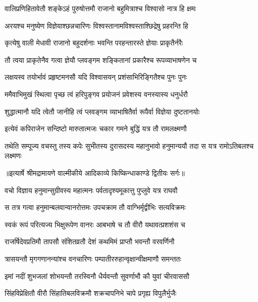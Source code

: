 \twolineshloka
{वालिप्रणिहितावेतौ शङ्केऽहं पुरुषोत्तमौ}
{राजानो बहुमित्राश्च विश्वासो नात्र हि क्षमः} %

\twolineshloka
{अरयश्च मनुष्येण विज्ञेयाश्छन्नचारिणः}
{विश्वस्तानामविश्वस्ताश्छिद्रेषु प्रहरन्ति हि} %

\twolineshloka
{कृत्येषु वाली मेधावी राजानो बहुदर्शनाः}
{भवन्ति परहन्तारस्ते ज्ञेयाः प्राकृतैर्नरैः} %

\twolineshloka
{तौ त्वया प्राकृतेनैव गत्वा ज्ञेयौ प्लवङ्गम}
{शङ्कितानां प्रकारैश्च रूपव्याभाषणेन च} %

\twolineshloka
{लक्षयस्व तयोर्भावं प्रहृष्टमनसौ यदि}
{विश्वासयन् प्रशंसाभिरिङ्गितैश्च पुनः पुनः} %

\twolineshloka
{ममैवाभिमुखं स्थित्वा पृच्छ त्वं हरिपुङ्गव}
{प्रयोजनं प्रवेशस्य वनस्यास्य धनुर्धरौ} %

\twolineshloka
{शुद्धात्मानौ यदि त्वेतौ जानीहि त्वं प्लवङ्गम}
{व्याभाषितैर्वा रूपैर्वा विज्ञेया दुष्टतानयोः} %

\twolineshloka
{इत्येवं कपिराजेन सन्दिष्टो मारुतात्मजः}
{चकार गमने बुद्धिं यत्र तौ रामलक्ष्मणौ} %

\fourlineindentedshloka
{तथेति सम्पूज्य वचस्तु तस्य}
{कपेः सुभीतस्य दुरासदस्य}
{महानुभावो हनुमान्ययौ तदा}
{स यत्र रामोऽतिबलश्च लक्ष्मणः} %


{॥इत्यार्षे श्रीमद्रामायणे वाल्मीकीये आदिकाव्ये किष्किन्धाकाण्डे द्वितीयः सर्गः॥}


\twolineshloka
{वचो विज्ञाय हनुमान्सुग्रीवस्य महात्मनः}
{पर्वतादृश्यमूकात्तु पुप्लुवे यत्र राघवौ} %

\twolineshloka
{स तत्र गत्वा हनुमान्बलवान्वानरोत्तमः}
{उपचक्राम तौ वाग्भिर्मृद्वीभिः सत्यविक्रमः} %

\twolineshloka
{स्वकं रूपं परित्यज्य भिक्षुरूपेण वानरः}
{आबभाषे च तौ वीरौ यथावत्प्रशशंस च} %

\twolineshloka
{राजर्षिदेवप्रतिमौ तापसौ संशितव्रतौ}
{देशं कथमिमं प्राप्तौ भवन्तौ वरवर्णिनौ} %

\twolineshloka
{त्रासयन्तौ मृगगणानन्यांश्च वनचारिणः}
{पम्पातीररुहान्वृक्षान्वीक्षमाणौ समन्ततः} %

\twolineshloka
{इमां नदीं शुभजलां शोभयन्तौ तरस्विनौ}
{धैर्यवन्तौ सुवर्णाभौ कौ युवां चीरवाससौ} %

\twolineshloka
{सिंहविप्रेक्षितौ वीरौ सिंहातिबलविक्रमौ}
{शक्रचापनिभे चापे प्रगृह्य विपुलैर्भुजैः} %

